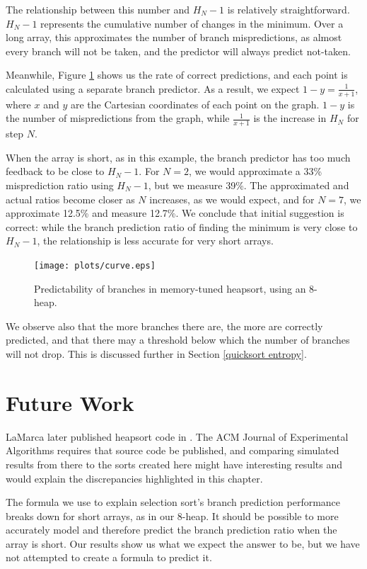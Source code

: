 The relationship between this number and $H_N-1$ is relatively straightforward.
$H_N-1$ represents the cumulative number of changes in the minimum. Over a long
array, this approximates the number of branch mispredictions, as almost every
branch will not be taken, and the predictor will always predict not-taken.

Meanwhile, Figure \ref{memory-tuned heapsort curve} shows us the rate of correct
predictions, and each point is calculated using a separate branch predictor. As
a result, we expect $1-y = \frac{1}{x+1}$, where $x$ and $y$ are the Cartesian
coordinates of each point on the graph. $1-y$ is the number of mispredictions
from the graph, while $\frac{1}{x+1}$ is the increase in $H_N$ for step $N$.

When the array is short, as in this example, the branch predictor has too much
feedback to be close to $H_N-1$. For $N=2$, we would approximate a 33\%
misprediction ratio using $H_N-1$, but we measure 39\%. The approximated and
actual ratios become closer as $N$ increases, as we would expect, and for $N=7$,
we approximate 12.5\% and measure 12.7\%. We conclude that initial suggestion is
correct: while the branch prediction ratio of finding the minimum is very close
to $H_N-1$, the relationship is less accurate for very short arrays.


\begin{figure}
\texttt{[image: plots/curve.eps]}
\caption{Predictability of branches in memory-tuned heapsort, using an 8-heap.}
\label{memory-tuned heapsort curve}
\end{figure}

\label{heapsort entropy}
We observe also that the more branches there are, the more are correctly
predicted, and that there may a threshold below which the number of branches will
not drop. This is discussed further in Section \ref{quicksort entropy}.

\section{Future Work}

LaMarca later published heapsort code in \cite{LaMarcaHeap96}. The ACM
Journal of Experimental Algorithms requires that source code be published, and
comparing simulated results from there to the sorts created here might have
interesting results and would explain the discrepancies highlighted in this
chapter.

The formula we use to explain selection sort's branch prediction performance
breaks down for short arrays, as in our 8-heap. It should be possible to more
accurately model and therefore predict the branch prediction ratio when the
array is short. Our results show us what we expect the answer to be, but we have
not attempted to create a formula to predict it.

